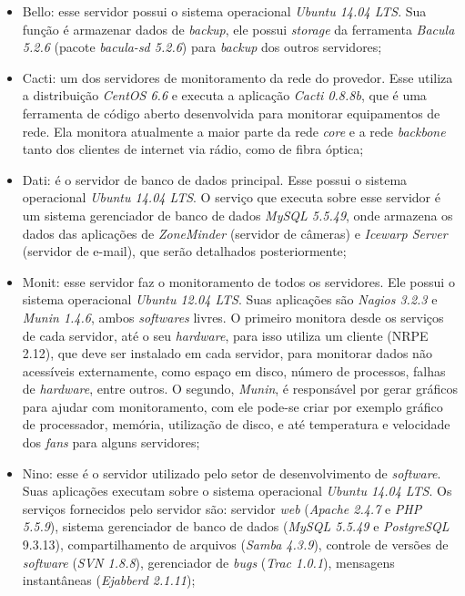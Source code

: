\begin{itemize}
 \item Bello: esse servidor possui o sistema operacional \textit{Ubuntu 14.04 \ac{LTS}}. Sua função é armazenar dados de \textit{backup}, ele 
 possui \textit{storage} da ferramenta \textit{Bacula 5.2.6} (pacote \textit{bacula-sd 5.2.6}) para \textit{backup} dos outros servidores;
 
 \item Cacti: um dos servidores de monitoramento da rede do provedor. Esse utiliza a distribuição \textit{CentOS 6.6} e executa a aplicação
 \textit{Cacti 0.8.8b}, que é uma ferramenta de código aberto desenvolvida para monitorar equipamentos de rede. Ela monitora atualmente a 
 maior parte da rede \textit{core} e a rede \textit{backbone} tanto dos clientes de internet via rádio, como de fibra óptica;
 
 \item Dati: é o servidor de banco de dados principal. Esse possui o sistema operacional \textit{Ubuntu 14.04 \ac{LTS}}. O serviço que executa
 sobre esse servidor é um sistema gerenciador de banco de dados \textit{MySQL 5.5.49}, onde armazena os dados das aplicações de 
 \textit{ZoneMinder} (servidor de câmeras) e \textit{Icewarp Server} (servidor de e-mail), que serão detalhados posteriormente;
 
 \item Monit: esse servidor faz o monitoramento de todos os servidores. Ele possui o sistema operacional \textit{Ubuntu 12.04 \ac{LTS}}.
 Suas aplicações são \textit{Nagios 3.2.3} e \textit{Munin 1.4.6}, ambos \textit{softwares} livres. O primeiro monitora desde os serviços de 
 cada servidor, até o seu \textit{hardware}, para isso utiliza um cliente (\ac{NRPE} 2.12), que deve ser instalado em cada servidor, para 
 monitorar dados não acessíveis externamente, como espaço em disco, número de processos, falhas de \textit{hardware}, entre outros. O segundo, 
 \textit{Munin}, é responsável por gerar gráficos para ajudar com monitoramento, com ele pode-se criar por exemplo gráfico de processador, 
 memória, utilização de disco, e até temperatura e velocidade dos \textit{fans} para alguns servidores;
 
 \item Nino: esse é o servidor utilizado pelo setor de desenvolvimento de \textit{software}. Suas aplicações executam sobre o sistema 
 operacional \textit{Ubuntu 14.04 \ac{LTS}}. Os serviços fornecidos pelo servidor são: servidor \textit{web} (\textit{Apache 2.4.7} e 
 \textit{\ac{PHP} 5.5.9}), sistema gerenciador de banco de dados (\textit{MySQL 5.5.49} e \textit{PostgreSQL} 9.3.13), compartilhamento de
 arquivos (\textit{Samba 4.3.9}), controle de versões de \textit{software} (\textit{\ac{SVN} 1.8.8}), gerenciador de \textit{bugs} 
 (\textit{Trac 1.0.1}), mensagens instantâneas (\textit{Ejabberd 2.1.11});
 

\end{itemize}
